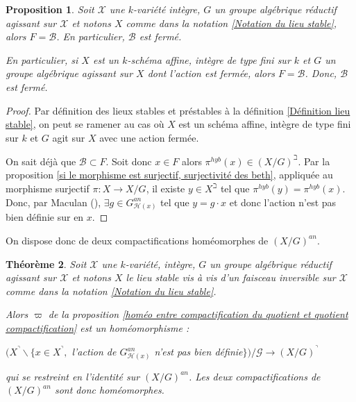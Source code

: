 \documentclass[11pt]{article}
\newtheorem{thm}{Théorème}[section]
\newtheorem{prop}[thm]{Proposition}
\newtheorem{ex}[thm]{Exemple}
\begin{document}
\begin{prop}\label{on peut caractériser le fermé qu on doit retirer dans la compactification}
Soit $\mathcal{X}$ une $k$-variété intègre, $G$ un groupe algébrique réductif agissant sur $\mathcal{X}$ et notons $X$ comme dans la notation \ref{Notation du lieu stable}, alors $F = \mathcal{B}$. En particulier, $\mathcal{B}$ est fermé.

En particulier, si $X$ est un $k$-schéma affine, intègre de type fini sur $k$ et $G$ un groupe algébrique agissant sur $X$ dont l'action est fermée, alors $F = \mathcal{B}$. Donc, $\mathcal{B}$ est fermé.
\end{prop}

\begin{proof}
Par définition des lieux stables et préstables à la définition \ref{Définition lieu stable}, on peut se ramener au cas où $X$ est un schéma affine, intègre de type fini sur $k$ et $G$ agit sur $X$ avec une action fermée.

On sait déjà que $\mathcal{B} \subset F$. Soit donc $x\in F$ alors $\pi^{hyb}(x) \in (X/G)^\beth$. Par la proposition \ref{si le morphisme est surjectif, surjectivité des beth}, appliquée au morphisme surjectif $\pi : X \rightarrow X/G$, il existe $y\in X^\beth$ tel que $\pi^{hyb}(y) = \pi^{hyb}(x)$. Donc, par Maculan (\cite{MaculanGIT}), $\exists g\in G^{an}_{\mathcal{H}(x)}$ tel que $y = g\cdot x$ et donc l'action n'est pas bien définie sur en $x$.
\end{proof}


On dispose donc de deux compactifications homéomorphes de $(X/G)^{an}$.

\begin{thm}\label{Si le morphisme est equidimensionnel, compactifications sont homeo}
Soit $\mathcal{X}$ une $k$-variété, intègre, $G$ un groupe algébrique réductif agissant sur $\mathcal{X}$ et notons $X$ le lieu stable vis à vis d'un faisceau inversible sur $\mathcal{X}$ comme dans la notation \ref{Notation du lieu stable}. 

Alors $\varpi$ de la proposition \ref{homéo entre compactification du quotient et quotient compactification} est un homéomorphisme :
\begin{center}
$(X^\urcorner \backslash \lbrace x\in X^\urcorner,$ l'action de $G^{an}_{\mathcal{H}(x)}$ n'est pas bien définie$\rbrace)/\mathcal{G} \rightarrow (X/G)^\urcorner$
\end{center}
qui se restreint en l'identité sur $(X/G)^{an}$. Les deux compactifications de $(X/G)^{an}$ sont donc homéomorphes.
\end{thm} 
\end{document}
